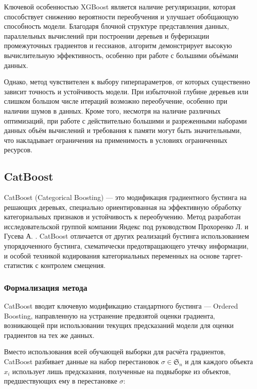 Ключевой особенностью XGBoost является наличие регуляризации, которая способствует снижению вероятности переобучения и улучшает обобщающую способность модели. Благодаря блочной структуре представления данных, параллельных вычислений при построении деревьев и буферизации промежуточных градиентов и гессианов, алгоритм демонстрирует высокую вычислительную эффективность, особенно при работе с большими объёмами данных.

Однако, метод чувствителен к выбору гиперпараметров, от которых существенно зависит точность и устойчивость модели. При избыточной глубине деревьев или слишком большом числе итераций возможно переобучение, особенно при наличии шумов в данных. Кроме того, несмотря на наличие различных оптимизаций, при работе с действительно большими и разреженными наборами данных объём вычислений и требования к памяти могут быть значительными, что накладывает ограничения на применимость в условиях ограниченных ресурсов.

\subsection{CatBoost}

CatBoost (Categorical Boosting) --- это модификация градиентного бустинга на решающих деревьях, специально ориентированная на эффективную обработку категориальных признаков и устойчивость к переобучению. Метод разработан исследовательской группой компании Яндекс под руководством Прохоренко Л. и Гусева А. \cite{prokhorenkova2018catboost}.  CatBoost отличается от других реализаций бустинга  использованием упорядоченного бустинга, схематически предотвращающего утечку информации, и особой техникой кодирования категориальных переменных на основе таргет-статистик с контролем смещения.

\subsubsection{Формализация метода}

CatBoost вводит ключевую модификацию стандартного бустинга --- Ordered Boosting, направленную на устранение предвзятой оценки градиента, возникающей при использовании текущих предсказаний модели для оценки градиентов на тех же данных.

Вместо использования всей обучающей выборки для расчёта градиентов, CatBoost разбивает данные на набор перестановок $\sigma \in \mathfrak{S}_n$ и для каждого объекта $x_i$ использует лишь предсказания, полученные на подвыборке из объектов, предшествующих ему в перестановке $\sigma$:

